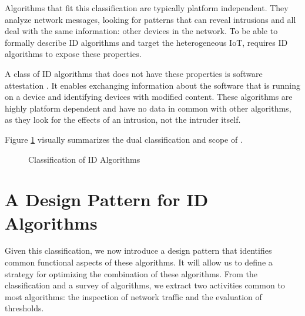 \documentclass[conference]{IEEEtran}
\begin{document}
Algorithms that fit this classification are typically platform independent.
They analyze network messages, looking for patterns that can reveal intrusions
and all deal with the same information: other devices in the network. To be
able to formally describe ID algorithms and target the heterogeneous IoT, \NAME
requires ID algorithms to expose these properties.

A class of ID algorithms that does not have these properties is software
attestation \cite{seshadri2008sake}. It enables exchanging information about
the software that is running on a device and identifying devices with modified
content. These algorithms are highly platform dependent and have no data in
common with other algorithms, as they look for the effects of an intrusion, not
the intruder itself.

Figure \ref{fig:classification} visually summarizes the dual classification and
scope of \NAME.

\begin{figure}[ht]
  \centering
  \caption{Classification of ID Algorithms}
  \label{fig:classification}
\end{figure}

\section{A Design Pattern for ID Algorithms}
\label{pattern}

Given this classification, we now introduce a design pattern that identifies
common functional aspects of these algorithms. It will allow us to define a
strategy for optimizing the combination of these algorithms. From the
classification and a survey of algorithms, we extract two activities common to
most algorithms: the inspection of network traffic and the evaluation of
thresholds.
\end{document}
